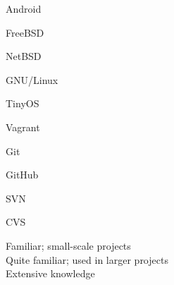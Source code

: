 \documentclass[a4paper,10pt]{article}
\begin{document}
\begin{itemize}
\begin{multicols}{3}
  \item Android   \hfill \twonotes
  \item FreeBSD   \hfill \twonotes
  \item NetBSD    \hfill \twonotes
  \item GNU/Linux \hfill \threenotes
  \item TinyOS    \hfill \onenote
\end{multicols}

\begin{multicols}{3}
  \item Vagrant \hfill \twonotes
  \item Git     \hfill \twonotes
  \item GitHub  \hfill \twonotes
  \item SVN     \hfill \onenote
  \item CVS     \hfill \onenote
\end{multicols}


\end{itemize}

\vspace{1em}

\begin{center}
\parbox[c]{8cm}{
  \onenote Familiar; small-scale projects \\
  \twonotes Quite familiar; used in larger projects \\
  \threenotes Extensive knowledge
}
\end{center}
\end{document}

